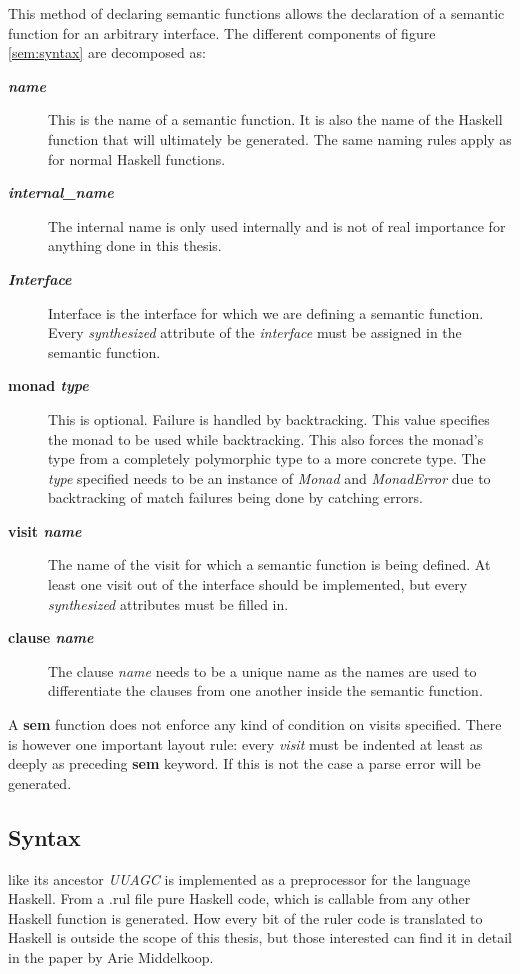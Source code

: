 This method of declaring semantic functions allows the declaration of a semantic function for an arbitrary interface. The different components of figure \ref{sem:syntax} are decomposed as:

\begin{description}
\item[\textbf{\textit{name}}] This is the name of a semantic function. It is also the name of the Haskell function that will ultimately be generated. The same naming rules apply as for normal Haskell functions.
\item[\textbf{\textit{internal\_name}}] The internal name is only used internally and is not of real importance for anything done in this thesis.
\item[\textbf{\textit{Interface}}] Interface is the interface for which we are defining a semantic function. Every \emph{synthesized} attribute of the \emph{interface} must be assigned in the semantic function.
\item[\textbf{monad \textit{type}}] { This is optional. Failure is handled by backtracking. This value specifies the monad to be used while backtracking. This also forces the monad's type from a completely polymorphic type to a more concrete type. The \textit{type} specified needs to be an instance of \emph{Monad} and \emph{MonadError} due to backtracking of match failures being done by catching errors.}
\item[\textbf{visit \textit{name}}] The name of the visit for which a semantic function is being defined. At least one visit out of the interface should be implemented, but every \emph{synthesized} attributes must be filled in.
\item[\textbf{clause \textit{name}}] The clause \textit{name} needs to be a unique name as the names are used to differentiate the clauses from one another inside the semantic function.
\end{description}

A \textbf{sem} function does not enforce any kind of condition on visits specified. There is however one important layout rule: every \emph{visit} must be indented at least as deeply as preceding \textbf{sem} keyword. If this is not the case a parse error will be generated.

\subsection{Syntax}
\Rcore like its ancestor \emph{UUAGC} is implemented as a preprocessor for the language Haskell. From a .rul file pure Haskell code, which is callable from any other Haskell function is generated. How every bit of the ruler code is translated to Haskell is outside the scope of this thesis, but those interested can find it in detail in the paper by Arie Middelkoop\cite{visitag}.

